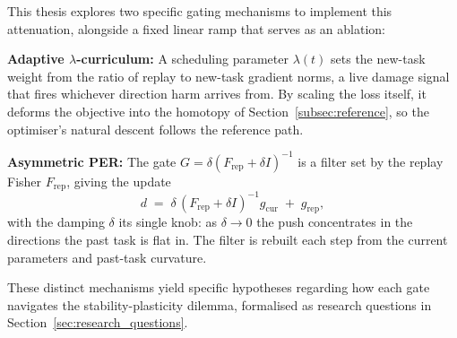 This thesis explores two specific gating mechanisms to implement this attenuation, alongside a fixed linear ramp that serves as an ablation:


\textbf{Adaptive $\lambda$-curriculum:} A scheduling parameter $\lambda(t)$ sets the new-task weight from the ratio of replay to new-task gradient norms, a live damage signal that fires whichever direction harm arrives from. By scaling the loss itself, it deforms the objective into the homotopy of Section~\ref{subsec:reference}, so the optimiser's natural descent follows the reference path.


\textbf{Asymmetric PER:} The gate $G = \delta(F_{\text{rep}}+\delta I)^{-1}$ is a filter set by the replay Fisher $F_{\text{rep}}$, giving the update
\begin{equation}
    d \;=\; \delta\,(F_{\text{rep}} + \delta I)^{-1} g_{\text{cur}} \;+\; g_{\text{rep}},
    \label{eq:asym_per}
\end{equation}
with the damping $\delta$ its single knob: as $\delta \to 0$ the push concentrates in the directions the past task is flat in. The filter is rebuilt each step from the current parameters and past-task curvature.

These distinct mechanisms yield specific hypotheses regarding how each gate navigates the stability-plasticity dilemma, formalised as research questions in Section~\ref{sec:research_questions}.
